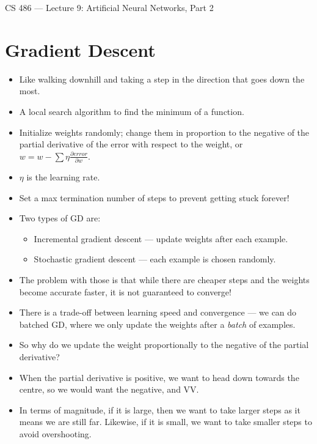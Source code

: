 \documentclass{article}
\author{Clement Tsang}
\begin{document}
\begin{center}
    \Large{CS 486 --- Lecture 9: Artificial Neural Networks, Part 2}
\end{center}

\section{Gradient Descent}
\begin{itemize}
    \item Like walking downhill and taking a step in the direction that goes down the most.
    \item A local search algorithm to find the minimum of a function.
    \item Initialize weights randomly; change them in proportion to the negative of the partial derivative of the error with respect to the weight, or $w = w - \sum \eta \frac{\partial error}{\partial w}$.
    \item $\eta$ is the learning rate.
    \item Set a max termination number of steps to prevent getting stuck forever!
    \item Two types of GD are:
        \begin{itemize}
            \item Incremental gradient descent --- update weights after each example.
            \item Stochastic gradient descent --- each example is chosen randomly.
        \end{itemize}
    \item The problem with those is that while there are cheaper steps and the weights become accurate faster, it is not guaranteed to converge!
    \item There is a trade-off between learning speed and convergence --- we can do batched GD, where we only update the weights after a \emph{batch} of examples.
    \item So why do we update the weight proportionally to the negative of the partial derivative?
    \item When the partial derivative is positive, we want to head down towards the centre, so we would want the negative, and VV.
    \item In terms of magnitude, if it is large, then we want to take larger steps as it means we are still far.  Likewise, if it is small, we want to take smaller steps to avoid overshooting.
\end{itemize}
\end{document}
